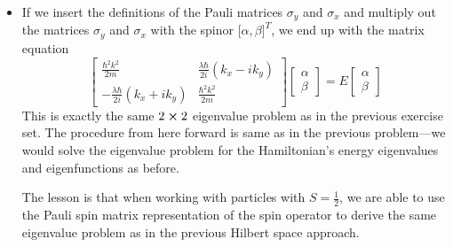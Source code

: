 \documentclass[11pt, a4paper]{article}
\newcommand{\Ham}{Hamiltonian\xspace}
\begin{document}
\begin{itemize}
	\item If we insert the definitions of the Pauli matrices $ \sigma_{y} $ and $ \sigma_{x} $ and multiply out the matrices $ \sigma_{y} $ and $ \sigma_{x} $ with the spinor $ \big[\alpha, \beta\big]^{T} $, we end up with the matrix equation
	\begin{equation*}
		\begin{bmatrix}
			\frac{\hbar^{2}k^{2}}{2m} & \frac{\lambda \hbar}{2i}(k_{x} - ik_{y})\\
			-\frac{\lambda \hbar}{2i}(k_{x} + ik_{y}) & \frac{\hbar^{2}k^{2}}{2m}
		\end{bmatrix}
		\begin{bmatrix}
			\alpha\\
			\beta
		\end{bmatrix}
		= 
		E
		\begin{bmatrix}
			\alpha\\
			\beta
		\end{bmatrix}
	\end{equation*}
	This is exactly the same $ 2 \cross 2 $ eigenvalue problem as in the previous exercise set. The procedure from here forward is same as in the previous problem---we would solve the eigenvalue problem for the \Ham's energy eigenvalues and eigenfunctions as before.
	
	The lesson is that when working with particles with $ S = \frac{1}{2} $, we are able to use the Pauli spin matrix representation of the spin operator to derive the same eigenvalue problem as in the previous Hilbert space approach.
\end{itemize}
\end{document}
